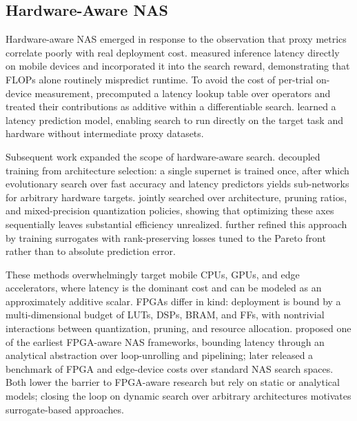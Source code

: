 \documentclass[11pt]{article}
\begin{document}
\subsection{Hardware-Aware NAS}
Hardware-aware NAS emerged in response to the observation that proxy metrics correlate poorly with real deployment cost.
\citet{tan2019mnasnet} measured inference latency directly on mobile devices and incorporated it into the search reward, demonstrating that FLOPs alone routinely mispredict runtime.
To avoid the cost of per-trial on-device measurement, \citet{wu2019fbnet} precomputed a latency lookup table over operators and treated their contributions as additive within a differentiable search.
\citet{cai2018proxylessnas} learned a latency prediction model, enabling search to run directly on the target task and hardware without intermediate proxy datasets.

Subsequent work expanded the scope of hardware-aware search.
\citet{cai2019once} decoupled training from architecture selection: a single supernet is trained once, after which evolutionary search over fast accuracy and latency predictors yields sub-networks for arbitrary hardware targets. \citet{wang2020apq} jointly searched over architecture, pruning ratios, and mixed-precision quantization policies, showing that optimizing these axes sequentially leaves substantial efficiency unrealized.
\citet{benmeziane2023multi} further refined this approach by training surrogates with rank-preserving losses tuned to the Pareto front rather  than to absolute prediction error.

These methods overwhelmingly target mobile CPUs, GPUs, and edge accelerators, where latency is the dominant cost and can be modeled as an approximately additive scalar.
FPGAs differ in kind: deployment is bound by a multi-dimensional budget of LUTs, DSPs, BRAM, and FFs, with nontrivial interactions between quantization, pruning, and resource allocation.
\citet{jiang2019accuracy} proposed one of the earliest FPGA-aware NAS frameworks, bounding latency through an analytical abstraction over loop-unrolling and pipelining; \citet{li2021hw} later released a benchmark of FPGA and edge-device costs over standard NAS search spaces.
Both lower the barrier to FPGA-aware research but rely on static or analytical models; closing the loop on dynamic search over arbitrary architectures motivates surrogate-based approaches.
\end{document}
